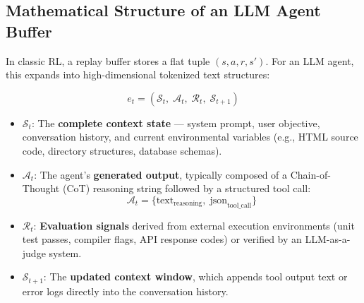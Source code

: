 \subsection{Mathematical Structure of an LLM Agent Buffer}
\label{mathematical-structure-of-an-llm-agent-buffer}

In classic RL, a replay buffer stores a flat tuple $(s, a, r, s')$. For an LLM agent, this expands into high-dimensional tokenized text structures:

\begin{equation}
\boxed{e_t = \left( \mathcal{S}_t,\; \mathcal{A}_t,\; \mathcal{R}_t,\; \mathcal{S}_{t+1} \right)}
\end{equation}

\begin{itemize}
  \item $\mathcal{S}_t$: The \textbf{complete context state} --- system prompt, user objective, conversation history, and current environmental variables (e.g., HTML source code, directory structures, database schemas).
  \item $\mathcal{A}_t$: The agent’s \textbf{generated output}, typically composed of a Chain-of-Thought (CoT) reasoning string followed by a structured tool call: 
\begin{equation}
\mathcal{A}_t = \{\text{text}_{\text{reasoning}},\; \text{json}_{\text{tool\_call}}\}
\end{equation}
  \item $\mathcal{R}_t$: \textbf{Evaluation signals} derived from external execution environments (unit test passes, compiler flags, API response codes) or verified by an LLM-as-a-judge system.
  \item $\mathcal{S}_{t+1}$: The \textbf{updated context window}, which appends tool output text or error logs directly into the conversation history.
\end{itemize}

